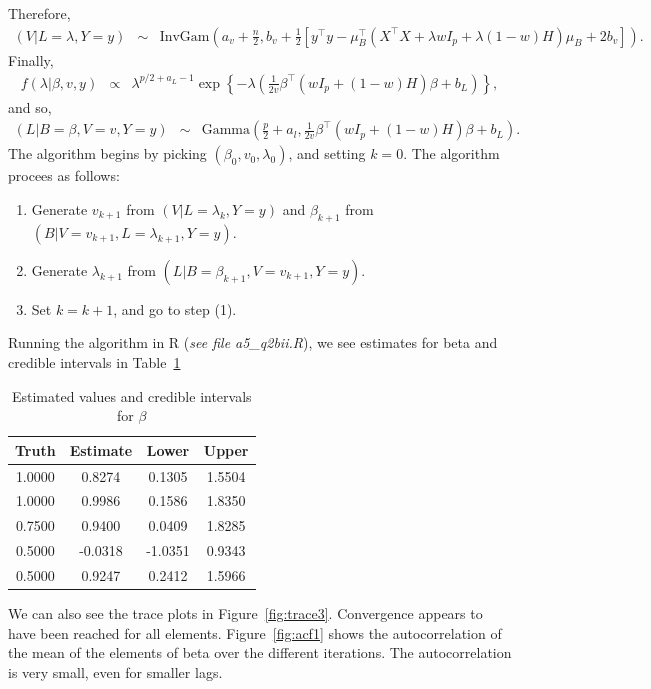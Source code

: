 \documentclass{article}\usepackage[]{graphicx}\usepackage[]{color}
\newcommand{\lb}{\left\{}
\newcommand{\rb}{\right\}}
\newcommand{\smat}{\left(X^\top X +\lambda w I_p + \lambda(1-w)H\right)}
\newcommand{\mub}{\mu_B}
\begin{document}
Therefore,
\begin{eqnarray*}
  (V | L=\lambda,Y=y) &\sim& \mbox{InvGam}\left(a_v+\frac{n}{2}, b_v + \frac{1}{2}\left[y^\top y - \mub^\top\smat\mub+2b_v\right] \right).
\end{eqnarray*}
Finally,
\begin{eqnarray*}
  f(\lambda | \beta,v,y) &\propto& \lambda^{p/2+a_L-1}\exp\lb-\lambda\left( \frac{1}{2v}\beta^\top (wI_p+(1-w)H) \beta +b_L \right)\rb, 
\end{eqnarray*}
and so,
\begin{eqnarray*}
  (L | B=\beta,V=v,Y=y) &\sim& \mbox{Gamma}\left(\frac{p}{2}+a_l, \frac{1}{2v}\beta^\top(wI_p+(1-w)H)\beta + b_L\right). 
\end{eqnarray*}
The algorithm begins by picking $(\beta_0, v_0, \lambda_0)$, and setting $k=0$.  The algorithm procees as follows:
\begin{enumerate}
  \item Generate $v_{k+1}$ from $(V | L=\lambda_k,Y=y)$ and $\beta_{k+1}$ from $(B | V=v_{k+1},L=\lambda_{k+1},Y=y)$.
  \item Generate $\lambda_{k+1}$ from $(L | B=\beta_{k+1},V=v_{k+1},Y=y)$.
  \item Set $k=k+1$, and go to step (1).
\end{enumerate}

Running the algorithm in R (\emph{see file a5\_q2bii.R}), we see estimates for beta and credible intervals in Table~\ref{tab:q2est}

\begin{table}[ht]
\centering
\begin{tabular}{cccc}
  \hline
  Truth & Estimate & Lower & Upper \\ 
  \hline
1.0000 & 0.8274 & 0.1305 & 1.5504 \\ 
  1.0000 & 0.9986 & 0.1586 & 1.8350 \\ 
  0.7500 & 0.9400 & 0.0409 & 1.8285 \\ 
  0.5000 & -0.0318 & -1.0351 & 0.9343 \\ 
  0.5000 & 0.9247 & 0.2412 & 1.5966 \\ 
   \hline
\end{tabular}
\caption{Estimated values and credible intervals for $\beta$}
\label{tab:q2est}
\end{table}

We can also see the trace plots in Figure~\ref{fig:trace3}.  Convergence appears to have been reached for all elements.  Figure~\ref{fig:acf1} shows the autocorrelation of the mean of the elements of beta over the different iterations.  The autocorrelation is very small, even for smaller lags.
\end{document}
